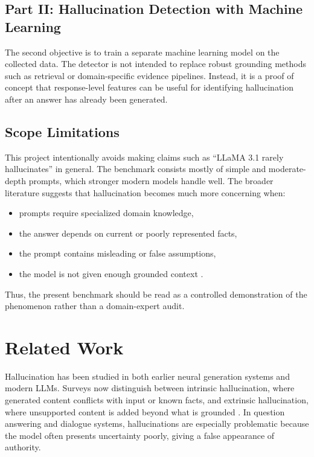 \documentclass[11pt]{article}
\begin{document}
\subsection{Part II: Hallucination Detection with Machine Learning}
The second objective is to train a separate machine learning model on the collected data. The detector is not intended to replace robust grounding methods such as retrieval or domain-specific evidence pipelines. Instead, it is a proof of concept that response-level features can be useful for identifying hallucination after an answer has already been generated.

\subsection{Scope Limitations}
This project intentionally avoids making claims such as ``LLaMA 3.1 rarely hallucinates'' in general. The benchmark consists mostly of simple and moderate-depth prompts, which stronger modern models handle well. The broader literature suggests that hallucination becomes much more concerning when:
\begin{itemize}[leftmargin=1.5em]
    \item prompts require specialized domain knowledge,
    \item the answer depends on current or poorly represented facts,
    \item the prompt contains misleading or false assumptions,
    \item the model is not given enough grounded context \cite{huang2023survey, dahl2024legal, pandit2025medhallu}.
\end{itemize}
Thus, the present benchmark should be read as a controlled demonstration of the phenomenon rather than a domain-expert audit.

\section{Related Work}
Hallucination has been studied in both earlier neural generation systems and modern LLMs. Surveys now distinguish between intrinsic hallucination, where generated content conflicts with input or known facts, and extrinsic hallucination, where unsupported content is added beyond what is grounded \cite{huang2023survey, rawte2023survey}. In question answering and dialogue systems, hallucinations are especially problematic because the model often presents uncertainty poorly, giving a false appearance of authority.
\end{document}
